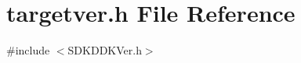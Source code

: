 \section{targetver.\+h File Reference}
\label{targetver_8h}
{\ttfamily \#include $<$S\+D\+K\+D\+D\+K\+Ver.\+h$>$}\newline
